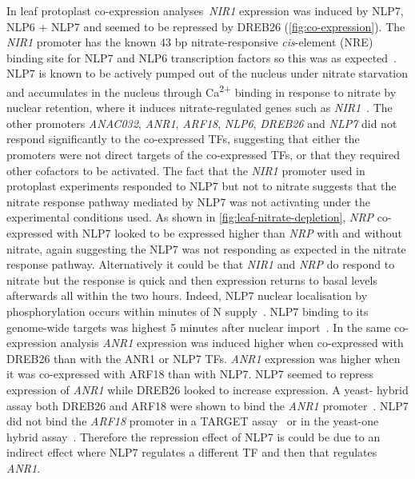 In leaf protoplast co\hyp{}expression analyses~\textit{NIR1} expression was induced by NLP7, NLP6 + NLP7 and seemed to be repressed by DREB26 (\autoref{fig:co-expression}).
The \textit{NIR1} promoter has the known 43 bp nitrate\hyp{}responsive \textit{cis}\hyp{}element (NRE) binding site for NLP7 and NLP6 transcription factors so this was as expected~\autocite{konishiArabidopsisNINlikeTranscription2013a}.
NLP7 is known to be actively pumped out of the nucleus under nitrate starvation and accumulates in the nucleus through Ca\textsuperscript{2+} binding in response to nitrate by nuclear retention, where it induces nitrate\hyp{}regulated genes such as \textit{NIR1}~\autocite{marchiveNuclearRetentionTranscription2013b}.
The other promoters \textit{ANAC032}, \textit{ANR1}, \textit{ARF18}, \textit{NLP6}, \textit{DREB26} and \textit{NLP7} did not respond significantly to the co\hyp{}expressed TFs, suggesting that either the promoters were not direct targets of the co\hyp{}expressed TFs, or that they required other cofactors to be activated. The fact that the \textit{NIR1} promoter used in protoplast experiments responded to NLP7 but not to nitrate suggests that the nitrate response pathway mediated by NLP7 was not activating under the experimental conditions used. As shown in \autoref{fig:leaf-nitrate-depletion}, \textit{NRP} co\hyp{}expressed with NLP7 looked to be expressed higher than \textit{NRP} with and without nitrate, again suggesting the NLP7 was not responding as expected in the nitrate response pathway. Alternatively it could be that \textit{NIR1} and \textit{NRP} do respond to nitrate but the response is quick and then expression returns to basal levels afterwards all within the two hours. Indeed, NLP7 nuclear localisation by phosphorylation occurs within minutes of N supply~\autocite{marchiveNuclearRetentionTranscription2013b,liuDiscoveryNitrateCPKNLPSignalling2017}. NLP7 binding to its genome\hyp{}wide targets was highest 5 minutes after nuclear import~\autocite{alvarezTransientGenomewideInteractions2020}.
In the same co\hyp{}expression analysis \textit{ANR1} expression was induced higher when co\hyp{}expressed with DREB26 than with the ANR1 or NLP7 TFs. \textit{ANR1} expression was higher when it was co\hyp{}expressed with ARF18 than with NLP7. NLP7 seemed to repress expression of \textit{ANR1} while DREB26 looked to increase expression. A yeast\hyp{} hybrid assay both DREB26 and ARF18 were shown to bind the \textit{ANR1} promoter~\autocite{gaudinierTranscriptionalRegulationNitrogenassociated2018}. NLP7 did not bind the \textit{ARF18} promoter in a TARGET assay~\autocite{alvarezTransientGenomewideInteractions2020} or in the yeast\hyp{}one hybrid assay~\autocite{gaudinierTranscriptionalRegulationNitrogenassociated2018}. Therefore the repression effect of NLP7 is could be due to an indirect effect where NLP7 regulates a different TF and then that regulates \textit{ANR1}.

